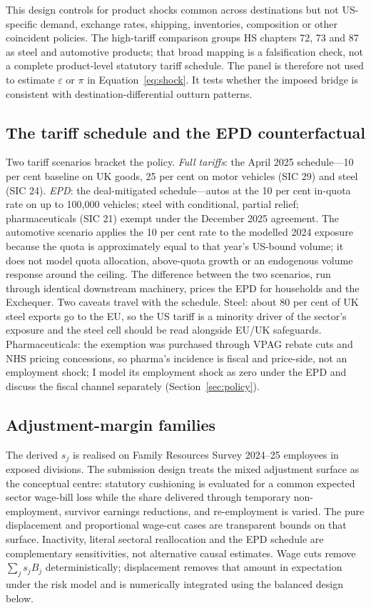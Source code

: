 This design controls for product shocks common across destinations but not
US-specific demand, exchange rates, shipping, inventories, composition or
other coincident policies. The high-tariff comparison groups HS chapters 72,
73 and 87 as steel and automotive products; that broad mapping is a
falsification check, not a complete product-level statutory tariff schedule.
The panel is therefore not used to estimate $\varepsilon$ or $\pi$ in
Equation~\eqref{eq:shock}. It tests whether the imposed bridge is consistent
with destination-differential outturn patterns.

\subsection{The tariff schedule and the EPD counterfactual}\label{sec:method-schedule}

Two tariff scenarios bracket the policy. \emph{Full tariffs}: the April 2025 schedule---10 per cent baseline on UK goods, 25 per cent on motor vehicles (SIC 29) and steel (SIC 24). \emph{EPD}: the deal-mitigated schedule---autos at the 10 per cent in-quota rate on up to 100,000 vehicles; steel with conditional, partial relief; pharmaceuticals (SIC 21) exempt under the December 2025 agreement. The automotive scenario applies the 10 per cent rate to the modelled 2024 exposure because the quota is approximately equal to that year's US-bound volume; it does not model quota allocation, above-quota growth or an endogenous volume response around the ceiling. The difference between the two scenarios, run through identical downstream machinery, prices the EPD for households and the Exchequer. Two caveats travel with the schedule. Steel: about 80 per cent of UK steel exports go to the EU, so the US tariff is a minority driver of the sector's exposure and the steel cell should be read alongside EU/UK safeguards. Pharmaceuticals: the exemption was purchased through VPAG rebate cuts and NHS pricing concessions, so pharma's incidence is fiscal and price-side, not an employment shock; I model its employment shock as zero under the EPD and discuss the fiscal channel separately (Section~\ref{sec:policy}).

\subsection{Adjustment-margin families}\label{sec:method-margins}

The derived $s_j$ is realised on Family Resources Survey 2024--25 employees
in exposed divisions. The submission design treats the mixed adjustment
surface as the conceptual centre: statutory cushioning is evaluated for a
common expected sector wage-bill loss while the share delivered through
temporary non-employment, survivor earnings reductions, and re-employment is
varied. The pure displacement and proportional wage-cut cases are transparent
bounds on that surface. Inactivity, literal sectoral reallocation and the EPD
schedule are complementary sensitivities, not alternative causal estimates.
Wage cuts remove $\sum_j s_j B_j$ deterministically; displacement removes
that amount in expectation under the risk model and is numerically integrated
using the balanced design below.

